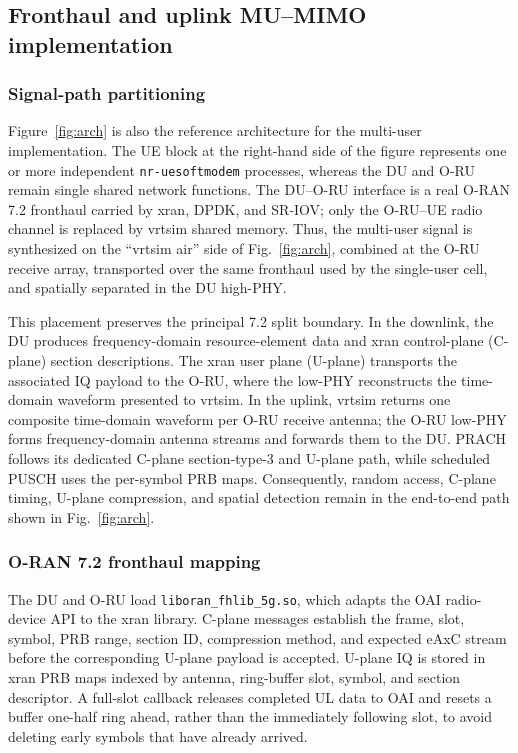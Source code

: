 \documentclass[11pt,a4paper]{article}
\begin{document}
\subsection{Fronthaul and uplink MU--MIMO implementation}
\label{sec:fh-mumimo-design}

\subsubsection{Signal-path partitioning}

Figure~\ref{fig:arch} is also the reference architecture for the multi-user implementation.
The UE block at the right-hand side of the figure represents one or more independent
\texttt{nr-uesoftmodem} processes, whereas the DU and O-RU remain single shared network
functions.  The DU--O-RU interface is a real O-RAN 7.2 fronthaul carried by xran, DPDK, and
SR-IOV; only the O-RU--UE radio channel is replaced by vrtsim shared memory.  Thus, the
multi-user signal is synthesized on the ``vrtsim air'' side of Fig.~\ref{fig:arch}, combined
at the O-RU receive array, transported over the same fronthaul used by the single-user cell,
and spatially separated in the DU high-PHY.

This placement preserves the principal 7.2 split boundary.  In the downlink, the DU produces
frequency-domain resource-element data and xran control-plane (C-plane) section descriptions.
The xran user plane (U-plane) transports the associated IQ payload to the O-RU, where the
low-PHY reconstructs the time-domain waveform presented to vrtsim.  In the uplink, vrtsim
returns one composite time-domain waveform per O-RU receive antenna; the O-RU low-PHY forms
frequency-domain antenna streams and forwards them to the DU.  PRACH follows its dedicated
C-plane section-type-3 and U-plane path, while scheduled PUSCH uses the per-symbol PRB maps.
Consequently, random access, C-plane timing, U-plane compression, and spatial detection remain
in the end-to-end path shown in Fig.~\ref{fig:arch}.

\subsubsection{O-RAN 7.2 fronthaul mapping}

The DU and O-RU load \texttt{liboran\_fhlib\_5g.so}, which adapts the OAI radio-device API to
the xran library.  C-plane messages establish the frame, slot, symbol, PRB range, section ID,
compression method, and expected eAxC stream before the corresponding U-plane payload is
accepted.  U-plane IQ is stored in xran PRB maps indexed by antenna, ring-buffer slot, symbol,
and section descriptor.  A full-slot callback releases completed UL data to OAI and resets a
buffer one-half ring ahead, rather than the immediately following slot, to avoid deleting early
symbols that have already arrived.
\end{document}
